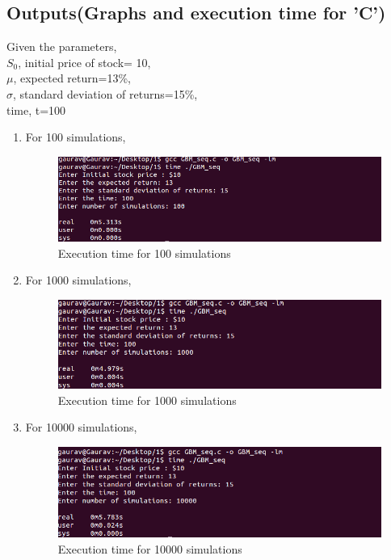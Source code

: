 \documentclass[10pt,a4paper]{article}
\begin{document}
\newpage
\subsection{Outputs(Graphs and execution time for 'C')}
Given the parameters,\\
$S_{0}$, initial price of stock= 10,\\
$\mu$, expected return=13\%,\\
$\sigma$, standard  deviation of returns=15\%,\\
time, t=100
\begin{enumerate}
\item For 100 simulations,\\
\begin{figure}[h]
\centering
\includegraphics[scale=0.5]{100_SIM_GBM_SERIAL_C}
\caption{Execution time for 100 simulations}
\end{figure}

\item For 1000 simulations,\\
\begin{figure}[h]
\centering
\includegraphics[scale=0.5]{1000_SIM_GBM_SERIAL_C}
\caption{Execution time for 1000 simulations}
\end{figure}

\newpage

\item For 10000 simulations,\\
\begin{figure}[h]
\centering
\includegraphics[scale=0.5]{10000_SIM_GBM_SERIAL_C}
\caption{Execution time for 10000 simulations}
\end{figure}


\end{enumerate}
\end{document}
